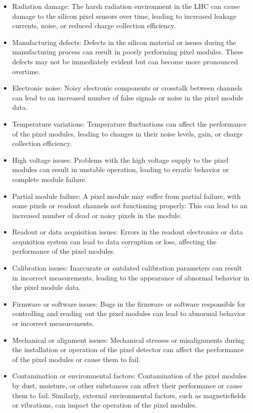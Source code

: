 \begin{itemize}

\item Radiation damage: The harsh radiation environment in the LHC can cause damage to the silicon pixel sensors over time, leading to increased leakage currents, noise, or reduced charge collection efficiency.

\item Manufacturing defects: Defects in the silicon material or issues during the manufacturing process can result in poorly performing pixel modules. These defects may not be immediately evident but can become more pronounced overtime.

\item Electronic noise: Noisy electronic components or crosstalk between channels can lead to an increased number of false signals or noise in the pixel module data.

\item Temperature variations: Temperature fluctuations can affect the performance of the pixel modules, leading to changes in their noise levels, gain, or charge collection efficiency.

\item High voltage issues: Problems with the high voltage supply to the pixel modules can result in unstable operation, leading to erratic behavior or complete module failure.

\item Partial module failure: A pixel module may suffer from partial failure, with some pixels or readout channels not functioning properly. This can lead to an increased number of dead or noisy pixels in the module.

\item Readout or data acquisition issues: Errors in the readout electronics or data acquisition system can lead to data corruption or loss, affecting the performance of the pixel modules.

\item Calibration issues: Inaccurate or outdated calibration parameters can result in incorrect measurements, leading to the appearance of abnormal behavior in the pixel module data.

\item Firmware or software issues: Bugs in the firmware or software responsible for controlling and reading out the pixel modules can lead to abnormal behavior or incorrect measurements.

\item Mechanical or alignment issues: Mechanical stresses or misalignments during the installation or operation of the pixel detector can affect the performance of the pixel modules or cause them to fail.

\item Contamination or environmental factors: Contamination of the pixel modules by dust, moisture, or other substances can affect their performance or cause them to fail. Similarly, external environmental factors, such as magneticfields or vibrations, can impact the operation of the pixel modules.

\end{itemize}

